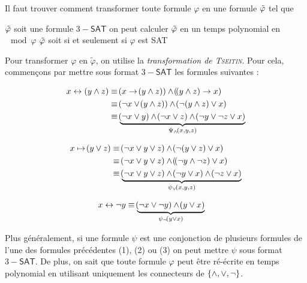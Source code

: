 \documentclass[a4paper,french,bookmarks]{book}
\newcommand{\SAT}{\textsf{SAT}}
\begin{document}
    Il faut trouver comment transformer toute formule $\varphi$ en une formule $\Tilde{\varphi}$ tel que
    
    \begin{enumerate}
        \itt $\Tilde{\varphi}$ soit une formule $3-\SAT$
        \itt on peut calculer $\Tilde{\varphi}$ en un temps polynomial en $\mod \varphi$
        \itt $\Tilde{\varphi}$ soit si et seulement si $\varphi$ est \SAT
    \end{enumerate}
    
    Pour transformer $\varphi$ en $\tilde \varphi$, on utilise la \emph{transformation de \textsc{Tseitin}}. Pour cela, commençons par mettre sous format $3-\SAT$ les formules suivantes :
    \begin{psse}
        \item \begin{align*}
            x \leftrightarrow (y \land z) &\equiv \p{x \to \p{y \land z}} \land \p{\p{y \land z} \to x}\\
            &\equiv \p{\neg x \lor \p{y \land z}} \land \p{\neg \p{y \land z } \lor x }\\
            &\equiv \underbrace{\p{\neg x \lor y } \land \p{\neg x \lor z } \land \p{\neg y \lor \neg z \lor x}}_{\Psi_\land\p{x, y, z}}
        \end{align*}
        
        \item \begin{align*}
            x \mapsto \p{y \lor z} &\equiv \p{\neg x \lor y \lor z} \land \p{\neg \p{y \lor z} \lor x}\\
            &\equiv \p{\neg x \lor y \lor z} \land \p{\p{\neg y \land \neg z} \lor x}\\
            &\equiv \underbrace{\p{\neg x \lor y \lor z} \land \p{\neg y \lor x} \land \p{\neg z \lor x}}_{\psi_\lor \p{x, y, z}}
        \end{align*}
        
        \item \begin{align*}
            x \leftrightarrow \neg y &\equiv \underbrace{\!\left(\neg x \lor \neg y\right) \land \!\left(y \lor x\right)}_{\psi_\neg\!\left(y \lor x\right)}
        \end{align*}
    \end{psse}
    
    Plus généralement, si une formule $\psi$ est une conjonction de plusieurs formules de l'une des formules précédentes (1), (2) ou (3) on peut mettre $\psi$ sous format $3-\SAT$. De plus, on sait que toute formule $\varphi$ peut être ré-écrite en temps polynomial en utilisant uniquement les connecteurs de $\left\{\land, \lor, \neg\right\}$.
    
\end{document}
